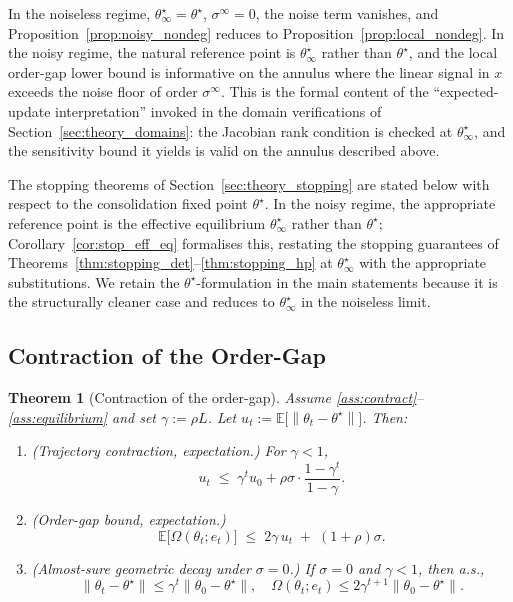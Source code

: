 \documentclass[12pt,a4paper]{article}
\newtheorem{theorem}[definition]{Theorem}
\newcommand{\norm}[1]{\left\lVert#1\right\rVert}
\newcommand{\Ogap}{\Omega}
\begin{document}
In the noiseless regime, $\theta^\star_\infty = \theta^\star$,
$\sigma^\infty = 0$, the noise term vanishes, and
Proposition~\ref{prop:noisy_nondeg} reduces to
Proposition~\ref{prop:local_nondeg}. In the noisy regime, the natural
reference point is $\theta^\star_\infty$ rather than $\theta^\star$, and the
local order-gap lower bound is informative on the annulus where the linear
signal in $x$ exceeds the noise floor of order $\sigma^\infty$. This is the
formal content of the ``expected-update interpretation'' invoked in the
domain verifications of Section~\ref{sec:theory_domains}: the Jacobian rank
condition is checked at $\theta^\star_\infty$, and the sensitivity bound it
yields is valid on the annulus described above.

The stopping theorems of Section~\ref{sec:theory_stopping} are stated below
with respect to the consolidation fixed point $\theta^\star$. In the noisy
regime, the appropriate reference point is the effective equilibrium
$\theta^\star_\infty$ rather than $\theta^\star$;
Corollary~\ref{cor:stop_eff_eq} formalises this, restating the stopping
guarantees of Theorems~\ref{thm:stopping_det}--\ref{thm:stopping_hp} at
$\theta^\star_\infty$ with the appropriate substitutions. We retain the
$\theta^\star$-formulation in the main statements because it is the
structurally cleaner case and reduces to $\theta^\star_\infty$ in the
noiseless limit.

\subsection{Contraction of the Order-Gap}
\label{sec:theory_contraction}

\begin{theorem}[Contraction of the order-gap]
\label{thm:contraction}
Assume \ref{ass:contract}--\ref{ass:equilibrium} and set $\gamma := \rho L$.
Let $u_t := \mathbb{E}\bigl[\norm{\theta_t - \theta^\star}\bigr]$. Then:
\begin{enumerate}
\item[(i)] \textnormal{(Trajectory contraction, expectation.)} For $\gamma < 1$,
\begin{equation}
\label{eq:traj_bound}
u_t \;\leq\; \gamma^t u_0 + \rho\sigma \cdot \frac{1 - \gamma^t}{1 - \gamma}.
\end{equation}
\item[(ii)] \textnormal{(Order-gap bound, expectation.)}
\begin{equation}
\label{eq:ogap_bound}
\mathbb{E}\bigl[\Ogap(\theta_t; e_t)\bigr]
\;\leq\; 2\gamma\, u_t \;+\; (1 + \rho)\sigma.
\end{equation}
\item[(iii)] \textnormal{(Almost-sure geometric decay under $\sigma = 0$.)}
If $\sigma = 0$ and $\gamma < 1$, then a.s.,
\begin{equation}
\label{eq:geom_decay_as}
\norm{\theta_t - \theta^\star} \leq \gamma^t \norm{\theta_0 - \theta^\star},
\quad
\Ogap(\theta_t; e_t) \leq 2\gamma^{t+1} \norm{\theta_0 - \theta^\star}.
\end{equation}
\end{enumerate}
\end{theorem}
\end{document}
